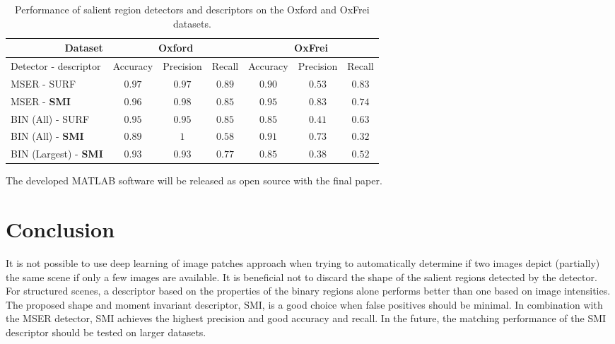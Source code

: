 \documentclass[a4paper,11pt]{article}
\begin{document}
\begin{table}[!ht]
\begin{center}
  \vspace{-4pt}
\begin{tabular}{|l|*{6}{c|}}  %
\hline
\multicolumn{1}{|r}{Dataset} & \multicolumn{3}{|c|}{Oxford}  & \multicolumn{3}{|c|}{OxFrei} \\ \hline
{Detector - descriptor}  & Accuracy      & Precision   &  Recall       & Accuracy        & Precision & Recall \\ \hline
MSER - SURF              & {\boldmath $0.97$} & $0.97$     & {\boldmath $0.89$} &  $0.90$         & $0.53$    & {\boldmath $0.83$}\\ \hline
MSER - \bf{SMI}          & {\boldmath $0.96$}       & {\boldmath $0.98$}&  {\boldmath$0.85$}       & {\boldmath $0.95$}    &{\boldmath $0.83$} &  {\boldmath$0.74$} \\ \hline
BIN (All) - SURF         & $0.95$       & $0.95$     &$0.85$        & $0.85$          & $0.41$    & $0.63$\\ \hline
BIN (All) - \bf{SMI}     & $0.89$        & {\boldmath $1$}   &$0.58$         & $0.91$          & $0.73$    & $0.32$\\ \hline
BIN (Largest) - \bf{SMI} & $0.93$        & $0.93$      &$0.77$         & $0.85$          & $0.38$    & $0.52$\\ \hline
\end{tabular}
\end{center}
\vspace{-18pt}
\caption{Performance of salient region detectors and descriptors on the Oxford and OxFrei datasets.} \label{tab:perf}
  \vspace{-10pt}
\end{table}

The developed MATLAB software will be released as open source with the final paper.
\section{Conclusion}
It is not possible to use deep learning of image patches approach when trying to automatically determine if two images depict (partially) the same scene if only a few images are available. It is beneficial not to discard the shape of the salient regions detected by the detector. For structured scenes, a descriptor based on the properties of the binary regions alone performs better than one based on image intensities.  The proposed shape and moment invariant descriptor, SMI, is a good choice when false positives should be minimal. In combination with the MSER detector, SMI achieves the highest precision and good accuracy and recall. In the future, the matching performance of the SMI descriptor should be tested on larger datasets.
\end{document}
